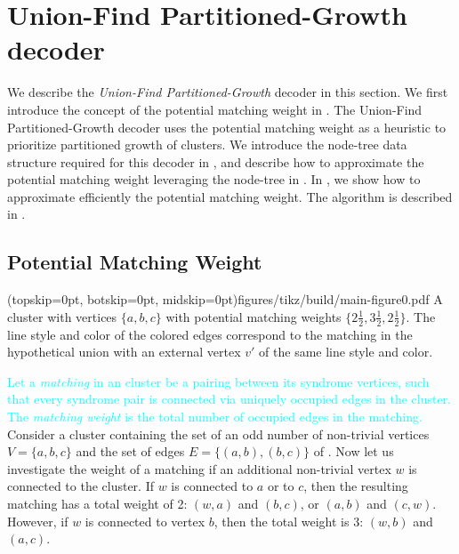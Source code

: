 \section{Union-Find Partitioned-Growth decoder}\label{sec:ufbb}
We describe the \emph{Union-Find Partitioned-Growth} decoder in this section. We first introduce the concept of the potential matching weight in . The Union-Find Partitioned-Growth decoder uses the potential matching weight as a heuristic to prioritize partitioned growth of clusters. We introduce the node-tree data structure required for this decoder in , and describe how to approximate the potential matching weight leveraging the node-tree in . In , we show how to approximate efficiently the potential matching weight. The algorithm is described in . 

\subsection{Potential Matching Weight}\label{sec:matchingweight}

\Figure[bt](topskip=0pt, botskip=0pt, midskip=0pt){figures/tikz/build/main-figure0.pdf}{
    A cluster with vertices $\{a,b,c\}$ with potential matching weights $\{2\frac{1}{2}, 3\frac{1}{2}, 2\frac{1}{2}\}$. The line style and color of the colored edges correspond to the matching in the hypothetical union with an external vertex $v'$ of the same line style and color.\label{fig0}}


\textcolor{cyan}{Let a \emph{matching} in an cluster be a pairing between its syndrome vertices, such that every syndrome pair is connected via uniquely occupied edges in the cluster. The \emph{matching weight} is the total number of occupied edges in the matching.} Consider a cluster containing the set of an odd number of non-trivial vertices $V=\{a,b,c\}$ and the set of edges $E=\{(a,b), (b, c)\}$ of . Now let us investigate the weight of a matching if an additional non-trivial vertex $w$ is connected to the cluster. If $w$ is connected to $a$ or to $c$, then the resulting matching has a total weight of 2: $(w,a)$ and $(b,c)$, or $(a,b)$ and $(c,w)$. However, if $w$ is connected to vertex $b$, then the total weight is 3: $(w, b)$ and $(a, c)$. %

